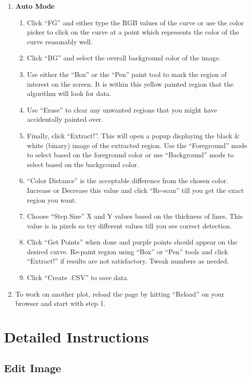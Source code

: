 \documentclass[letterpaper, 11pt]{article}
\begin{document}
\begin{enumerate}
\item{{\bf Auto Mode}
\begin{enumerate}
\item{Click ``FG'' and either type the RGB values of the curve or use the color picker to click on the curve at a point which represents the color of the curve reasonably well. }
\item{Click ``BG'' and select the overall background color of the image. }
\item{Use either the ``Box'' or the ``Pen'' paint tool to mark the region of interest on the screen. It is within this yellow painted region that the algorithm will look for data.}
\item{Use ``Erase'' to clear any unwanted regions that you might have accidentally painted over.}
\item{Finally, click ``Extract!''. This will open a popup displaying the black \& white (binary) image of the extracted region. Use the ``Foreground'' mode to select based on the foreground color or use ``Background'' mode to select based on the background color. }
\item{``Color Distance'' is the acceptable difference from the chosen color. Increase or Decrease this value and click ``Re-scan'' till you get the exact region you want.}
\item{Choose ``Step Size'' X and Y values based on the thickness of lines. This value is in pixels so try different values till you see correct detection. }
\item{Click ``Get Points'' when done and purple points should appear on the desired curve. Re-paint region using ``Box'' or ``Pen'' tools and click ``Extract!'' if results are not satisfactory. Tweak numbers as needed.}
\item{Click ``Create .CSV'' to save data.}
\end{enumerate}
}
\item{To work on another plot, reload the page by hitting ``Reload'' on your browser and start with step 1.}
\end{enumerate}

\section{Detailed Instructions}

\subsection{Edit Image}
\end{document}

